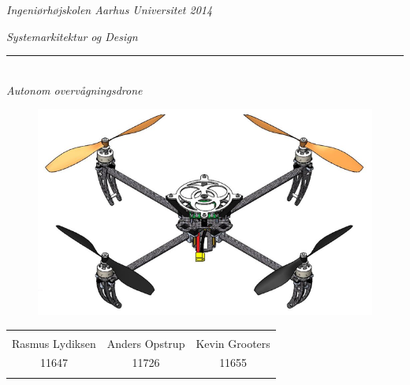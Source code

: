 \thispagestyle{empty}

\begin{center}
\textsl{Ingeniørhøjskolen Aarhus Universitet 2014 } \\ \vspace{0.5cm}

\phantom{hul}

\textsl{\HUGE Systemarkitektur og Design } \\ \vspace{0cm}
\rule{15cm}{0.5mm}  \\ \vspace{0.5cm}
\textsl{\LARGE Autonom overvågningsdrone } \\ \vspace{0.5cm}

\vspace{3.5cm}

\begin{figure}[H]
\centering
\includegraphics[width=1\textwidth]{Billeder/Forsidebillede.png}
\label{fig:Forside_foranalyse}
\end{figure}


\vspace{3.5cm}

\begin{table}[H]
	\centering
		\begin{tabular}{c c c}
			\underline{\phantom{mmmmmmmmmmmmmm}} & \underline{\phantom{mmmmmmmmmmmmmm}} & \underline{\phantom{mmmmmmmmmmmmmm}} \\
			Rasmus Lydiksen			& Anders Opstrup 		& Kevin Grooters 			\\
			11647					& 11726					& 11655\\
			&&\\												
		\end{tabular}
\end{table}
\end{center}

